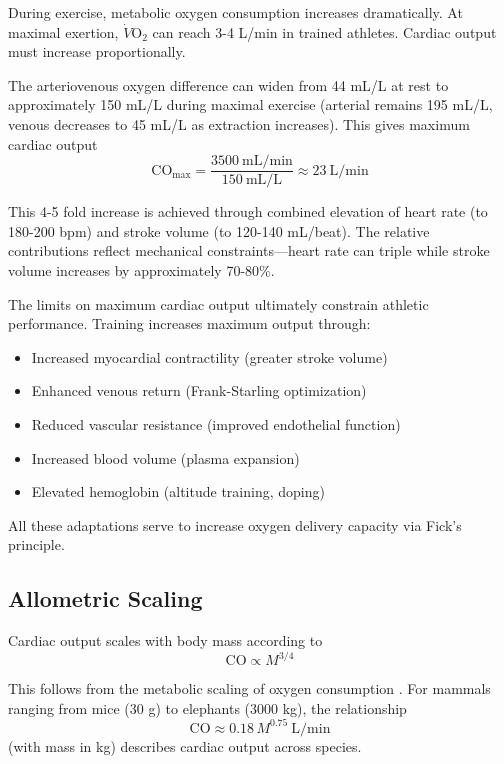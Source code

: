 During exercise, metabolic oxygen consumption increases dramatically. At maximal exertion, $\dot{V}\mathrm{O}_{2}$ can reach 3-4 L/min in trained athletes. Cardiac output must increase proportionally.

The arteriovenous oxygen difference can widen from 44 mL/L at rest to approximately 150 mL/L during maximal exercise (arterial remains 195 mL/L, venous decreases to 45 mL/L as extraction increases). This gives maximum cardiac output
\begin{equation}
\mathrm{CO}_{\max} = \frac{3500~\mathrm{mL/min}}{150~\mathrm{mL/L}} \approx 23~\mathrm{L/min}
\end{equation}

This 4-5 fold increase is achieved through combined elevation of heart rate (to 180-200 bpm) and stroke volume (to 120-140 mL/beat). The relative contributions reflect mechanical constraints—heart rate can triple while stroke volume increases by approximately 70-80\%.

The limits on maximum cardiac output ultimately constrain athletic performance. Training increases maximum output through:
\begin{itemize}
\item Increased myocardial contractility (greater stroke volume)
\item Enhanced venous return (Frank-Starling optimization)
\item Reduced vascular resistance (improved endothelial function)
\item Increased blood volume (plasma expansion)
\item Elevated hemoglobin (altitude training, doping)
\end{itemize}

All these adaptations serve to increase oxygen delivery capacity via Fick's principle.

\subsection{Allometric Scaling}

Cardiac output scales with body mass according to
\begin{equation}
\mathrm{CO} \propto M^{3/4}
\end{equation}

This follows from the metabolic scaling of oxygen consumption \cite{west1997general}. For mammals ranging from mice (30 g) to elephants (3000 kg), the relationship
\begin{equation}
\mathrm{CO} \approx 0.18 \, M^{0.75}~\mathrm{L/min}
\end{equation}
(with mass in kg) describes cardiac output across species.

